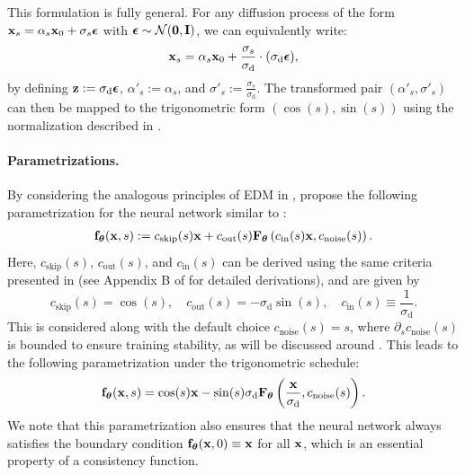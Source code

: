 This formulation is fully general. For any diffusion process of the form ${\mathbf{x}}_s = \alpha_s {\mathbf{x}}_0 + \sigma_s \bm{\epsilon}$ with $\bm{\epsilon} \sim \mathcal{N}(\bm{0}, {\mathbf{I}})$, we can equivalently write:
\[
{\mathbf{x}}_s = \alpha_s {\mathbf{x}}_0 + \frac{\sigma_s}{\sigma_\mathrm{d}} \cdot (\sigma_{\mathrm{d}} \bm{\epsilon}),
\]
by defining ${\mathbf{z}} := \sigma_{\mathrm{d}} \bm{\epsilon}$, $\alpha'_s := \alpha_s$, and $\sigma'_s := \frac{\sigma_s}{\sigma_{\mathrm{d}}}$. The transformed pair $(\alpha'_s, \sigma'_s)$ can then be mapped to the trigonometric form $(\cos(s), \sin(s))$ using the normalization described in .


\paragraph{Parametrizations.}
By considering the analogous principles of EDM in , \citet{lu2024simplifying} propose the following parametrization for the neural network similar to :
\begin{align*}
    {\mathbf{f}}_{\bm{\theta}}({\mathbf{x}}, s) := c_{\mathrm{skip}}(s){\mathbf{x}} + c_{\mathrm{out}}(s){\mathbf{F}}_{\bm{\theta}}\left(c_{\mathrm{in}}(s){\mathbf{x}}, c_{\mathrm{noise}}(s)\right).
\end{align*}
Here, $c_{\mathrm{skip}}(s)$, $c_{\mathrm{out}}(s)$, and $c_{\mathrm{in}}(s)$ can be derived using the same criteria presented in  (see Appendix B of \citet{lu2024simplifying} for detailed derivations), and are given by
\[
c_{\mathrm{skip}}(s) = \cos(s), \quad c_{\mathrm{out}}(s) = -\sigma_{\mathrm{d}} \sin(s), \quad c_{\mathrm{in}}(s) \equiv \frac{1}{\sigma_{\mathrm{d}}}.
\]
This is considered along with the default choice $c_{\mathrm{noise}}(s) = s$, where $\partial_s c_{\mathrm{noise}}(s)$ is bounded to ensure training stability, as will be discussed around . This leads to the following parametrization under the trigonometric schedule:
\begin{align}\label{eq:trig-nn}
    {\mathbf{f}}_{\bm{\theta}}({\mathbf{x}}, s) = \cos(s){\mathbf{x}} - \sin(s)\sigma_{\mathrm{d}}{\mathbf{F}}_{\bm{\theta}}\left(\frac{{\mathbf{x}}}{\sigma_{\mathrm{d}}}, c_{\mathrm{noise}}(s)\right).
\end{align}
We note that this parametrization also ensures that the neural network always satisfies the boundary condition ${\mathbf{f}}_{\bm{\theta}}({\mathbf{x}}, 0) \equiv {\mathbf{x}}$ for all ${\mathbf{x}}$, which is an essential property of a consistency function.



